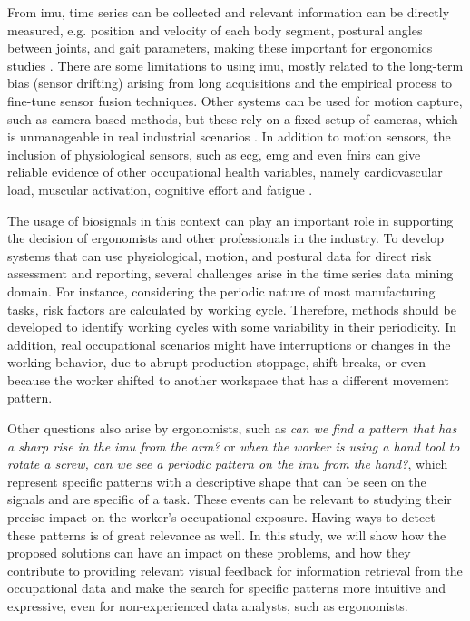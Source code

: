 From \gls{imu}, time series can be collected and relevant information can be directly measured, e.g. position and velocity of each body segment, postural angles between joints, and gait parameters, making these important for ergonomics studies \cite{Caputo2019, Hang19}. There are some limitations to using \gls{imu}, mostly related to the long-term bias (sensor drifting) arising from long acquisitions and the empirical process to fine-tune sensor fusion techniques. Other systems can be used for motion capture, such as camera-based methods, but these rely on a fixed setup of cameras, which is unmanageable in real industrial scenarios \cite{sara}. In addition to motion sensors, the inclusion of physiological sensors, such as \gls{ecg}, \gls{emg} and even \gls{fnirs} can give reliable evidence of other occupational health variables, namely cardiovascular load, muscular activation, cognitive effort and fatigue \cite{silva_rip, cardiovascular_load, rythm_cyclic_work, rui_varandas}.

The usage of biosignals in this context can play an important role in supporting the decision of ergonomists and other professionals in the industry. To develop systems that can use physiological, motion, and postural data for direct risk assessment and reporting, several challenges arise in the time series data mining domain. For instance, considering the periodic nature of most manufacturing tasks, risk factors are calculated by working cycle. Therefore, methods should be developed to identify working cycles with some variability in their periodicity. In addition, real occupational scenarios might have interruptions or changes in the working behavior, due to abrupt production stoppage, shift breaks, or even because the worker shifted to another workspace that has a different movement pattern. 

Other questions also arise by ergonomists, such as \textit{can we find a pattern that has a sharp rise in the \gls{imu} from the arm?} or \textit{when the worker is using a hand tool to rotate a screw, can we see a periodic pattern on the \gls{imu} from the hand?}, which represent specific patterns with a descriptive shape that can be seen on the signals and are specific of a task. These events can be relevant to studying their precise impact on the worker's occupational exposure. Having ways to detect these patterns is of great relevance as well. In this study, we will show how the proposed solutions can have an impact on these problems, and how they contribute to providing relevant visual feedback for information retrieval from the occupational data and make the search for specific patterns more intuitive and expressive, even for non-experienced data analysts, such as ergonomists.

